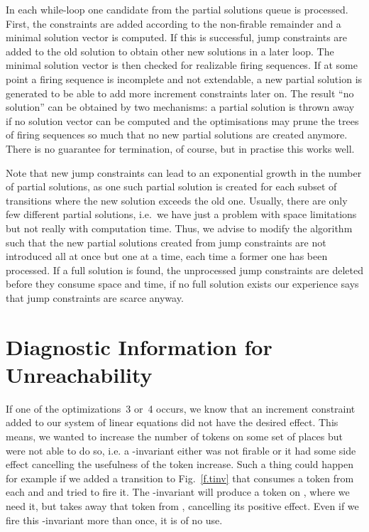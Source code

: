 \documentclass{LMCS}
\begin{document}
In each while-loop one candidate from the partial solutions queue is processed. First, the constraints 
are added according to the non-firable remainder  and a minimal solution vector  is computed.
If this is successful, jump constraints are added to the old solution  to obtain other new solutions
in a later loop. The minimal solution vector  is then checked for realizable firing sequences.
If at some point a firing sequence is incomplete and not extendable, a new partial solution is
generated to be able to add more increment constraints later on. The result ``no solution''
can be obtained by two mechanisms: a partial solution is thrown away if no solution vector 
can be computed and the optimisations may prune the trees of firing sequences so much that no
new partial solutions are created anymore. There is no guarantee for termination, of course,
but in practise this works well.

Note that new jump constraints can lead to an exponential growth in the number of partial solutions,
as one such partial solution is created for each subset of transitions where the new solution
exceeds the old one. Usually, there are only few different partial solutions, i.e.\ we have just a
problem with space limitations but not really with computation time. Thus, we advise to modify the algorithm
such that the new partial solutions created from jump constraints are not introduced all at once but one at a time, each time
a former one has been processed. If a full solution is found, the unprocessed jump constraints
are deleted before they consume space and time, if no full solution exists our experience says
that jump constraints are scarce anyway.

\section{Diagnostic Information for Unreachability}\label{sec7}

If one of the optimizations~3 or~4 occurs, we know that an increment constraint  added to our system of linear equations
did not have the desired effect. This means, we wanted to increase the number of tokens on some set of places but
were not able to do so, i.e. a -invariant either was not firable or it had some side effect cancelling the usefulness
of the token increase. Such a thing could happen for example if we added a transition  to Fig.~\ref{f.tinv}
that consumes a token from each  and  and tried to fire it. The -invariant  will produce a token on , where we need
it, but takes away that token from , cancelling its positive effect. Even if we fire this -invariant more
than once, it is of no use.
\end{document}
